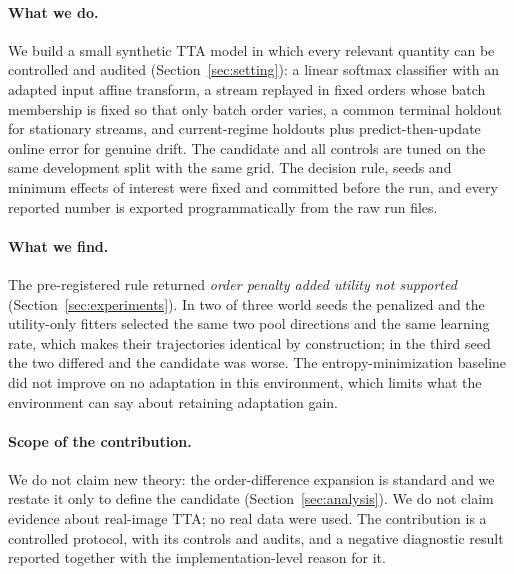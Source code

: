 \paragraph{What we do.} We build a small synthetic TTA model in which every relevant quantity can be
controlled and audited (Section~\ref{sec:setting}): a linear softmax classifier with an adapted input affine
transform, a stream replayed in fixed orders whose batch membership is fixed so that only batch order
varies, a common terminal holdout for stationary streams, and current-regime holdouts plus
predict-then-update online error for genuine drift. The candidate and all controls are tuned on the same
development split with the same grid. The decision rule, seeds and minimum effects of interest were fixed
and committed before the run, and every reported number is exported programmatically from the raw run files.

\paragraph{What we find.} The pre-registered rule returned \emph{order penalty added utility not
supported} (Section~\ref{sec:experiments}). In two of three world seeds the penalized and the utility-only
fitters selected the same two pool directions and the same learning rate, which makes their trajectories
identical by construction; in the third seed the two differed and the candidate was worse. The
entropy-minimization baseline did not improve on no adaptation in this environment, which limits what the
environment can say about retaining adaptation gain.

\paragraph{Scope of the contribution.} We do not claim new theory: the order-difference expansion is
standard and we restate it only to define the candidate (Section~\ref{sec:analysis}). We do not claim
evidence about real-image TTA; no real data were used. The contribution is a controlled protocol, with
its controls and audits, and a negative diagnostic result reported together with the implementation-level
reason for it.
